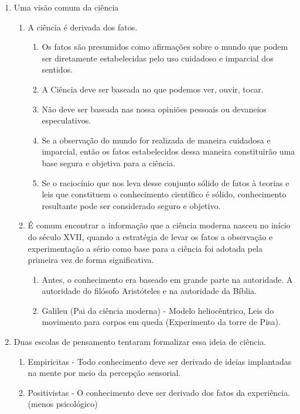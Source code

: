 \documentclass{article}
\begin{document}
\begin{enumerate}
    \item Uma visão comum da ciência
    \begin{enumerate}
        \item A ciência é derivada dos fatos.
        \begin{enumerate}
            \item Os fatos são presumidos como afirmações sobre o mundo que podem ser diretamente estabelecidas pelo uso cuidadoso e imparcial dos sentidos.
            \item A Ciência deve ser baseada no que podemos ver, ouvir, tocar.
            \item Não deve ser baseada nas nossa opiniões pessoais ou devaneios especulativos.
            \item Se a observação do mundo for realizada de maneira cuidadosa e imparcial, então os fatos estabelecidos dessa maneira constituirão uma base segura e objetiva para a ciência.
            \item Se o raciocínio que nos leva desse conjunto sólido de fatos à teorias e leis que constituem o conhecimento científico é sólido, conhecimento resultante pode ser considerado seguro e objetivo.  
        \end{enumerate}
        \item É comum encontrar a informação que a ciência moderna nasceu no início do século XVII, quando a estratégia de levar os fatos a observação e experimentação a sério como base para a ciência foi adotada pela primeira vez de forma significativa.
        \begin{enumerate}
            \item Antes, o conhecimento era baseado em grande parte na autoridade. A autoridade do filósofo Aristóteles e na autoridade da Bíblia. 
            \item Galileu (Pai da ciência moderna) - Modelo heliocêntrico, Leis do movimento para corpos em queda (Experimento da torre de Pisa).
        \end{enumerate}
    \end{enumerate}
    \item Duas escolas de pensamento tentaram formalizar essa ideia de ciência.
    \begin{enumerate}
        \item Empiricitas - Todo conhecimento deve ser derivado de ideias implantadas na mente por meio da percepção sensorial.
        \item Positivistas - O conhecimento deve ser derivado dos fatos da experiência. (menos psicológico)

\end{enumerate}
\end{enumerate}
\end{document}
